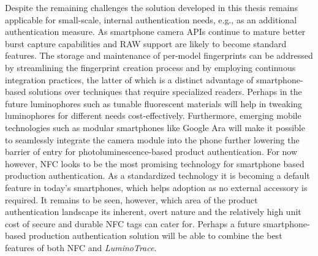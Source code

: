 \documentclass[thesis.tex]{subfiles}
\begin{document}
Despite the remaining challenges the solution developed in this thesis remains applicable for small-scale, internal authentication needs, e.g., as an additional authentication measure. As smartphone camera APIs continue to mature better burst capture capabilities and RAW support are likely to become standard features. The storage and maintenance of per-model fingerprints can be addressed by streamlining the fingerprint creation process and by employing continuous integration practices, the latter of which is a distinct advantage of smartphone-based solutions over techniques that require specialized readers. Perhaps in the future luminophores such as tunable fluorescent materials will help in tweaking luminophores for different needs cost-effectively. Furthermore, emerging mobile technologies such as modular smartphones like Google Ara will make it possible to seamlessly integrate the camera module into the phone further lowering the barrier of entry for photoluminescence-based product authentication. For now however, NFC looks to be the most promising technology for smartphone based production authentication. As a standardized technology it is becoming a default feature in today's smartphones, which helps adoption as no external accessory is required. It remains to be seen, however, which area of the product authentication landscape its inherent, overt nature and the relatively high unit cost of secure and durable NFC tags can cater for. Perhaps a future smartphone-based production authentication solution will be able to combine the best features of both NFC and \emph{LuminoTrace}.
\end{document}
